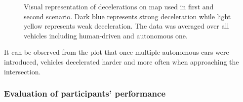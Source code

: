 \documentclass[11pt,english]{article}
\begin{document}
\begin{figure}[h]
\centering
{}


\caption{Visual representation of decelerations on map used in first and second scenario. Dark blue represents strong deceleration while light yellow represents weak deceleration. The data was averaged over all vehicles including human-driven and autonomous one.}
\label{fig:decelerations1}
\end{figure}

It can be observed from the plot that once multiple autonomous cars were introduced, vehicles decelerated harder and more often when approaching the intersection.







\subsubsection{Evaluation of participants' performance}
\end{document}
